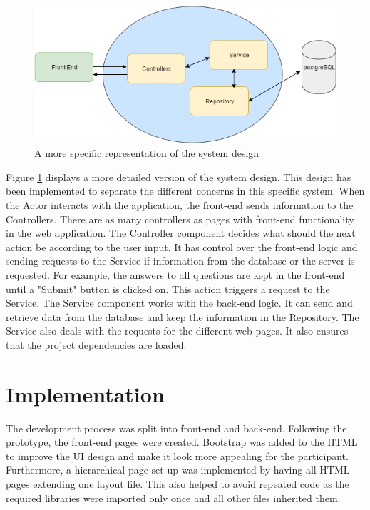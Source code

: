\documentclass{l4proj}
\begin{document}
\begin{figure}[H]
\centering
\includegraphics[width=12cm]{moreSpecificDesign.png}
\caption{A more specific representation of the system design}
\label{moreSpecificDesign}
\end{figure}

Figure \ref{moreSpecificDesign} displays a more detailed version of the system design. This design has been implemented to separate the different concerns in this specific system. When the Actor interacts with the application, the front-end sends information to the Controllers. There are as many controllers as pages with front-end functionality in the web application. The Controller component decides what should the next action be according to the user input. It has control over the front-end logic and sending requests to the Service if information from the database or the server is requested. For example, the answers to all questions are kept in the front-end until a "Submit" button is clicked on. This action triggers a request to the Service. The Service component works with the back-end logic. It can send and retrieve data from the database and keep the information in the Repository. The Service also deals with the requests for the different web pages. It also ensures that the project dependencies are loaded.   




\section{Implementation}

The development process was split into front-end and back-end. Following the prototype, the front-end pages were created. Bootstrap was added to the HTML to improve the UI design and make it look more appealing for the participant. Furthermore, a hierarchical page set up was implemented by having all HTML pages extending one layout file. This also helped to avoid repeated code as the required libraries were imported only once and all other files inherited them. 
\end{document}
